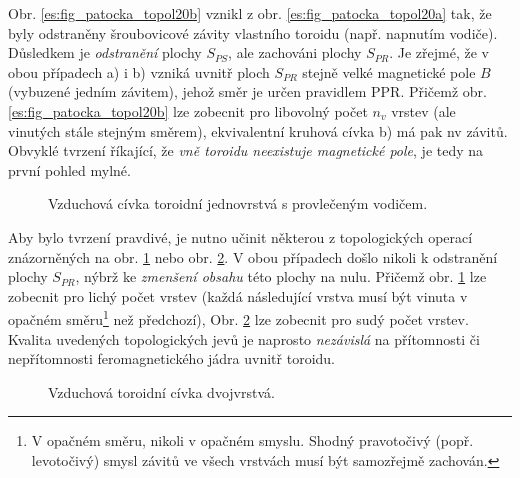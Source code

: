         Obr. \ref{es:fig_patocka_topol20b} vznikl z obr. \ref{es:fig_patocka_topol20a} tak, že byly 
        odstraněny šroubovicové závity vlastního toroidu (např. napnutím vodiče). Důsledkem je 
        \emph{odstranění} plochy \(S_{PS}\), ale zachováni plochy \(S_{PR}\). Je zřejmé, že v obou 
        případech a) i b) vzniká uvnitř ploch \(S_{PR}\) stejně velké magnetické pole \(B\) 
        (vybuzené jedním závitem), jehož směr je určen pravidlem PPR. Přičemž obr. 
        \ref{es:fig_patocka_topol20b} lze zobecnit pro libovolný počet \(n_v\) vrstev (ale vinutých 
        stále stejným směrem), ekvivalentní kruhová cívka b) má pak nv závitů. Obvyklé tvrzení 
        říkající, že \emph{vně toroidu neexistuje magnetické pole}, je tedy na první pohled mylné.
        \begin{figure}[ht!]
          \centering  
          \caption{ Vzduchová cívka toroidní jednovrstvá s provlečeným vodičem. 
                    \cite[s.~58]{Patocka4}} 
          \label{es:fig_patocka_topol20}
        \end{figure}
        Aby bylo tvrzení pravdivé, je nutno učinit některou z topologických operací znázorněných na 
        obr. \ref{es:fig_patocka_topol20} nebo obr. \ref{es:fig_patocka_topol21}. V obou případech 
        došlo nikoli k odstranění plochy \(S_{PR}\), nýbrž ke \emph{zmenšení obsahu} této plochy na 
        nulu. Přičemž obr. \ref{es:fig_patocka_topol20} lze zobecnit pro lichý počet vrstev (každá 
        následující vrstva musí být vinuta v opačném směru\footnote{V opačném směru, nikoli v 
        opačném smyslu. Shodný pravotočivý (popř. levotočivý) smysl závitů ve všech vrstvách musí 
        být samozřejmě zachován.} než předchozí), Obr. \ref{es:fig_patocka_topol21} lze zobecnit 
        pro sudý počet vrstev. Kvalita uvedených topologických jevů je naprosto \emph{nezávislá} 
        na přítomnosti či nepřítomnosti feromagnetického jádra uvnitř toroidu.
        \begin{figure}[ht!]
          \centering  
          \caption{ Vzduchová toroidní cívka dvojvrstvá. \cite[s.~59]{Patocka4}} 
          \label{es:fig_patocka_topol21}
        \end{figure}

